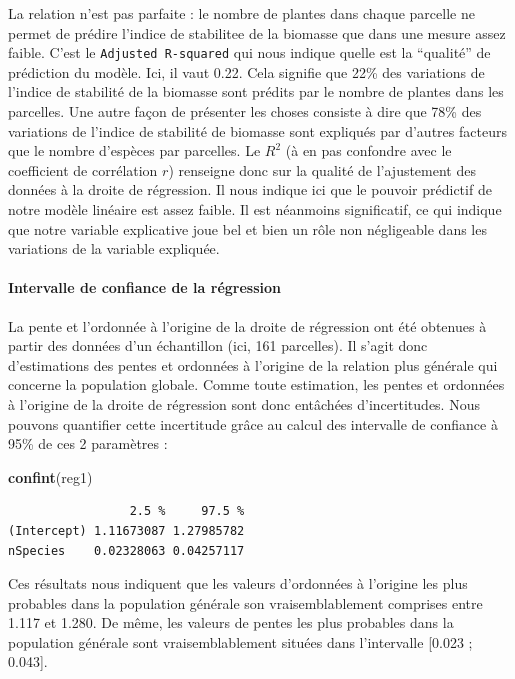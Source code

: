 \documentclass[a4paperpaper,]{article}
\newenvironment{Shaded}{\begin{snugshade}}{\end{snugshade}}
\newcommand{\KeywordTok}[1]{\textcolor[rgb]{0.12,0.11,0.11}{\textbf{#1}}}
\newcommand{\NormalTok}[1]{\textcolor[rgb]{0.12,0.11,0.11}{#1}}
\let\oldparagraph\paragraph
\renewcommand{\paragraph}[1]{\oldparagraph{#1}\mbox{}}
\begin{document}
La relation n'est pas parfaite : le nombre de plantes dans chaque parcelle ne permet de prédire l'indice de stabilitee de la biomasse que dans une mesure assez faible. C'est le \texttt{Adjusted\ R-squared} qui nous indique quelle est la ``qualité'' de prédiction du modèle. Ici, il vaut 0.22. Cela signifie que 22\% des variations de l'indice de stabilité de la biomasse sont prédits par le nombre de plantes dans les parcelles. Une autre façon de présenter les choses consiste à dire que 78\% des variations de l'indice de stabilité de biomasse sont expliqués par d'autres facteurs que le nombre d'espèces par parcelles. Le \(R^2\) (à en pas confondre avec le coefficient de corrélation \(r\)) renseigne donc sur la qualité de l'ajustement des données à la droite de régression. Il nous indique ici que le pouvoir prédictif de notre modèle linéaire est assez faible. Il est néanmoins significatif, ce qui indique que notre variable explicative joue bel et bien un rôle non négligeable dans les variations de la variable expliquée.

\hypertarget{intervalle-de-confiance-de-la-regression}{%
\paragraph{Intervalle de confiance de la régression}\label{intervalle-de-confiance-de-la-regression}}

La pente et l'ordonnée à l'origine de la droite de régression ont été obtenues à partir des données d'un échantillon (ici, 161 parcelles). Il s'agit donc d'estimations des pentes et ordonnées à l'origine de la relation plus générale qui concerne la population globale. Comme toute estimation, les pentes et ordonnées à l'origine de la droite de régression sont donc entâchées d'incertitudes. Nous pouvons quantifier cette incertitude grâce au calcul des intervalle de confiance à 95\% de ces 2 paramètres :

\begin{Shaded}
\begin{Highlighting}[]
\KeywordTok{confint}\NormalTok{(reg1)}
\end{Highlighting}
\end{Shaded}

\begin{verbatim}
                 2.5 %     97.5 %
(Intercept) 1.11673087 1.27985782
nSpecies    0.02328063 0.04257117
\end{verbatim}

Ces résultats nous indiquent que les valeurs d'ordonnées à l'origine les plus probables dans la population générale son vraisemblablement comprises entre 1.117 et 1.280. De même, les valeurs de pentes les plus probables dans la population générale sont vraisemblablement situées dans l'intervalle {[}0.023 ; 0.043{]}.
\end{document}
